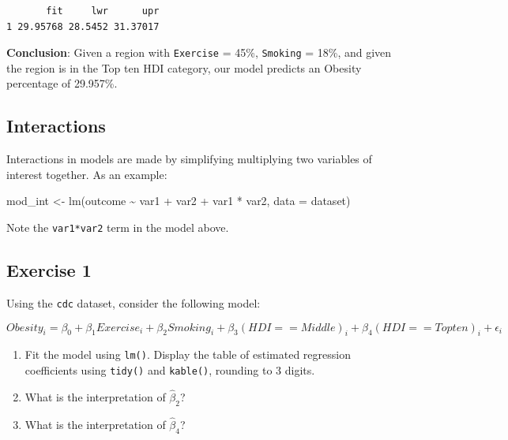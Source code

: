\documentclass[
  letterpaper,
  DIV=11,
  numbers=noendperiod]{scrartcl}
\newenvironment{Shaded}{\begin{snugshade}}{\end{snugshade}}
\newcommand{\AttributeTok}[1]{\textcolor[rgb]{0.40,0.45,0.13}{#1}}
\newcommand{\FunctionTok}[1]{\textcolor[rgb]{0.28,0.35,0.67}{#1}}
\newcommand{\NormalTok}[1]{\textcolor[rgb]{0.00,0.23,0.31}{#1}}
\newcommand{\OtherTok}[1]{\textcolor[rgb]{0.00,0.23,0.31}{#1}}
\newcommand{\SpecialCharTok}[1]{\textcolor[rgb]{0.37,0.37,0.37}{#1}}
\begin{document}
\begin{verbatim}
       fit     lwr      upr
1 29.95768 28.5452 31.37017
\end{verbatim}

\textbf{Conclusion}: Given a region with \texttt{Exercise} = 45\%,
\texttt{Smoking} = 18\%, and given the region is in the Top ten HDI
category, our model predicts an Obesity percentage of 29.957\%.

\subsection{Interactions}\label{interactions}

Interactions in models are made by simplifying multiplying two variables
of interest together. As an example:

\begin{Shaded}
\begin{Highlighting}[]
\NormalTok{mod\_int }\OtherTok{\textless{}{-}} \FunctionTok{lm}\NormalTok{(outcome }\SpecialCharTok{\textasciitilde{}}\NormalTok{ var1 }\SpecialCharTok{+}\NormalTok{ var2 }\SpecialCharTok{+}\NormalTok{ var1 }\SpecialCharTok{*}\NormalTok{ var2, }\AttributeTok{data =}\NormalTok{ dataset)}
\end{Highlighting}
\end{Shaded}

Note the \texttt{var1*var2} term in the model above.

\subsection{Exercise 1}\label{exercise-1}

Using the \texttt{cdc} dataset, consider the following model:

\[Obesity_i = \beta_0 + \beta_1Exercise_i + \beta_2Smoking_i + \beta_3(HDI == Middle)_i + \beta_4 (HDI == Top ten)_i + \epsilon_i\]

\begin{enumerate}
\def\labelenumi{\alph{enumi}.}
\item
  Fit the model using \texttt{lm()}. Display the table of estimated
  regression coefficients using \texttt{tidy()} and \texttt{kable()},
  rounding to 3 digits.
\item
  What is the interpretation of \(\hat \beta_2\)?
\item
  What is the interpretation of \(\hat \beta_4\)?
\end{enumerate}
\end{document}

